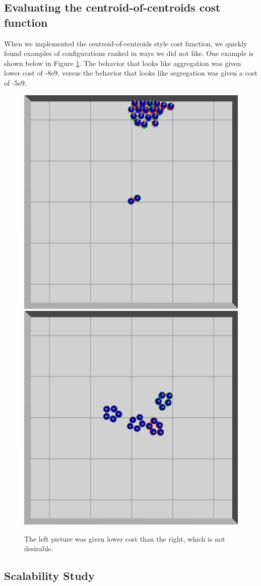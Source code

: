 \documentclass[conference]{IEEEtran}
\begin{document}
  \subsection{Evaluating the centroid-of-centroids cost function} \label{section:evaluting_cost_functions}

    When we implemented the centroid-of-centroids style cost function, we quickly found examples of configurations ranked in ways we did not like. One example is shown below in Figure \ref{fig:cost_function_fuckup}. The behavior that looks like aggregation was given lower cost of -8e9, versus the behavior that looks like segregation was given a cost of -5e9.

    \begin{figure}[H]
      \centering
      \includegraphics[width=0.49\linewidth]{./images/individual_0_gen_0.png}
      \includegraphics[width=0.49\linewidth]{./images/individual_0_gen_1_better.png}
      \caption{The left picture was given lower cost than the right, which is not desirable.}
      \label{fig:cost_function_fuckup}
    \end{figure}

  \subsection{Scalability Study} \label{section:scalability}
\end{document}
